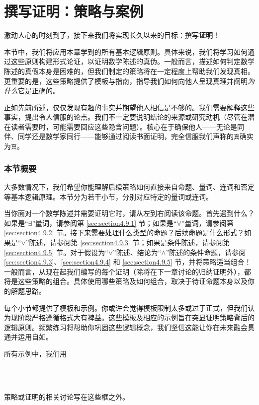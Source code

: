 \section{撰写证明：策略与案例}\label{sec:section4.9}

激动人心的时刻到了，接下来我们将实现长久以来的目标：撰写\textbf{证明}！

本节中，我们将应用本章学到的所有基本逻辑原则。具体来说，我们将学习如何通过这些原则构建形式论证，以证明数学陈述的真伪。一般而言，描述如何判定数学陈述的真假本身是困难的，但我们制定的策略将在一定程度上帮助我们发现真相。更重要的是，这些策略提供了模板与指南，指导我们如何向他人呈现真理并阐明\emph{为什么}它是正确的。

正如先前所述，仅仅发现有趣的事实并期望他人相信是不够的。我们需要解释这些事实，提出令人信服的论点。我们不一定要说明结论的来源或研究动机（尽管在潜在读者需要时，可能需要回应这些隐含问题）。核心在于确保他人——无论是同伴、同学还是数学家同行——能够通过阅读书面证明，完全信服我们声称的\verb|真|确实为\verb|真|。

\subsubsection*{本节概要}

大多数情况下，我们希望你能理解后续策略如何直接来自命题、量词、连词和否定等基本逻辑原理。本节分为若干小节，分别对应特定的量词或连词。

当你面对一个数学陈述并需要证明它时，请从左到右阅读该命题。首先遇到什么？如果是``$\exists$''量词，请参阅第 \ref{sec:section4.9.1} 节；如果是``$\forall$''量词，请参阅第 \ref{sec:section4.9.2} 节。接下来需要处理什么类型的命题？后续命题是什么形式？如果是``$\lor$''陈述，请参阅第 \ref{sec:section4.9.3} 节；如果是条件陈述，请参阅第 \ref{sec:section4.9.5} 节。对于假设为``$\lor$''陈述、结论为``$\land$''陈述的条件命题，请参阅 \ref{sec:section4.9.3}、\ref{sec:section4.9.4} 和 \ref{sec:section4.9.5} 节，并将策略适当组合！一般而言，从现在起我们编写的每个证明（除将在下一章讨论的归纳证明外），都将是这些策略的组合。具体使用哪些策略及如何组合，取决于待证命题本身以及你的解题思路。

每个小节都提供了模板和示例。你或许会觉得模板限制太多或过于正式，但我们认为现阶段严格遵循格式大有裨益。这些模板及相应的示例旨在突显证明策略背后的逻辑原则。频繁练习将帮助你巩固这些逻辑概念，我们坚信这能让你在未来融会贯通并运用自如。

所有示例中，我们用
\begin{center}
\setlength\fboxsep{1pt} \\
 \\
\end{center}
策略或证明的相关讨论写在这些框之外。

